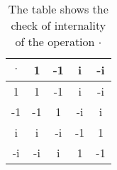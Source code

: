 \begin{table}[h]
\centering
\begin{tabular}{c|cccc}
$\cdot$ & 1  & -1 & i  & -i \\ \hline
1       & 1  & -1 & i  & -i \\
-1      & -1 & 1  & -i & i  \\
i       & i  & -i & -1 & 1  \\
-i      & -i & i  & 1  & -1
\end{tabular}
\caption{The table shows the check of internality of the operation $\cdot$}
\label{tab:internality_table}
\end{table}